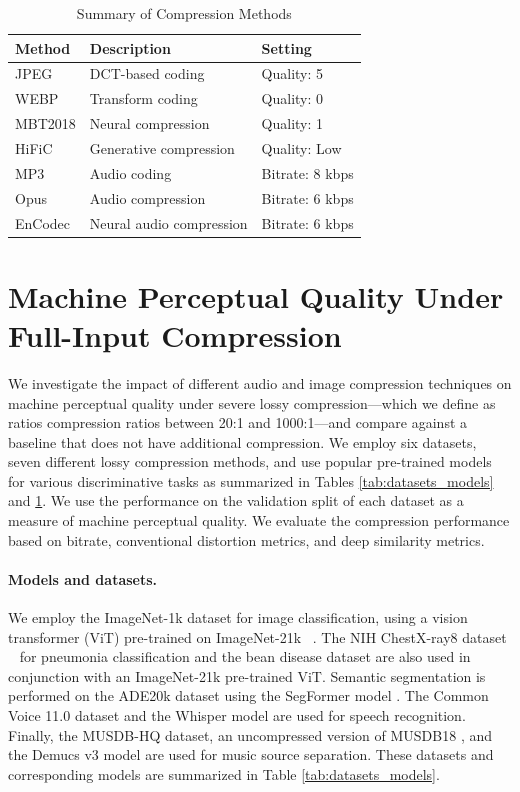 \documentclass[10pt,twocolumn,letterpaper]{article}
\begin{document}
\begin{table}[ht]
\centering
\caption{Summary of Compression Methods}
\label{tab:compression_methods}
\begin{tabular}{lll}
\toprule
Method & Description & Setting \\
\midrule
JPEG & DCT-based coding & Quality: 5 \\
WEBP & Transform coding & Quality: 0 \\
MBT2018 & Neural compression & Quality: 1 \\
HiFiC & Generative compression & Quality: Low \\
MP3 & Audio coding & Bitrate: 8 kbps \\
Opus & Audio compression & Bitrate: 6 kbps \\
EnCodec & Neural audio compression & Bitrate: 6 kbps \\
\bottomrule
\end{tabular}
\end{table}


\section{Machine Perceptual Quality Under Full-Input Compression}

We investigate the impact of different audio and image compression techniques on machine perceptual quality under severe lossy compression---which we define as ratios compression ratios between 20:1 and 1000:1---and compare against a baseline that does not have additional compression. We employ six datasets, seven different lossy compression methods, and use popular pre-trained models for various discriminative tasks as summarized in Tables \ref{tab:datasets_models} and \ref{tab:compression_methods}. We use the performance on the validation split of each dataset as a measure of machine perceptual quality. We evaluate the compression performance based on bitrate, conventional distortion metrics, and deep similarity metrics. 

\paragraph{Models and datasets.} We employ the ImageNet-1k dataset for image classification, using a vision transformer (ViT) pre-trained on ImageNet-21k ~\cite{dosovitskiy2020image}. The NIH ChestX-ray8 dataset ~\cite{wang2017chestx} for pneumonia classification and the bean disease dataset \cite{singh2023classification} are also used in conjunction with an ImageNet-21k pre-trained ViT. Semantic segmentation is performed on the ADE20k dataset \cite{zhou2017scene} using the SegFormer model \cite{xie2021segformer}. The Common Voice 11.0 dataset \cite{ardila2020common} and the Whisper model \cite{radford2023robust} are used for speech recognition. Finally, the MUSDB-HQ dataset, an uncompressed version of MUSDB18 \cite{rafii2017musdb18}, and the Demucs v3 model \cite{defossez2021hybrid} are used for music source separation. These datasets and corresponding models are summarized in Table \ref{tab:datasets_models}.
\end{document}
